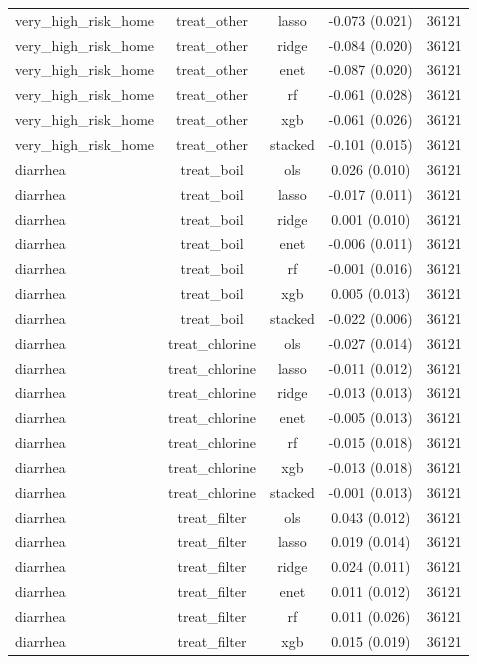 \begin{table}[htbp]
\begin{tabular}{lcccc}
very_high_risk_home & treat_other & lasso & -0.073 (0.021) & 36121 \\
very_high_risk_home & treat_other & ridge & -0.084 (0.020) & 36121 \\
very_high_risk_home & treat_other & enet & -0.087 (0.020) & 36121 \\
very_high_risk_home & treat_other & rf & -0.061 (0.028) & 36121 \\
very_high_risk_home & treat_other & xgb & -0.061 (0.026) & 36121 \\
very_high_risk_home & treat_other & stacked & -0.101 (0.015) & 36121 \\
diarrhea & treat_boil & ols & 0.026 (0.010) & 36121 \\
diarrhea & treat_boil & lasso & -0.017 (0.011) & 36121 \\
diarrhea & treat_boil & ridge & 0.001 (0.010) & 36121 \\
diarrhea & treat_boil & enet & -0.006 (0.011) & 36121 \\
diarrhea & treat_boil & rf & -0.001 (0.016) & 36121 \\
diarrhea & treat_boil & xgb & 0.005 (0.013) & 36121 \\
diarrhea & treat_boil & stacked & -0.022 (0.006) & 36121 \\
diarrhea & treat_chlorine & ols & -0.027 (0.014) & 36121 \\
diarrhea & treat_chlorine & lasso & -0.011 (0.012) & 36121 \\
diarrhea & treat_chlorine & ridge & -0.013 (0.013) & 36121 \\
diarrhea & treat_chlorine & enet & -0.005 (0.013) & 36121 \\
diarrhea & treat_chlorine & rf & -0.015 (0.018) & 36121 \\
diarrhea & treat_chlorine & xgb & -0.013 (0.018) & 36121 \\
diarrhea & treat_chlorine & stacked & -0.001 (0.013) & 36121 \\
diarrhea & treat_filter & ols & 0.043 (0.012) & 36121 \\
diarrhea & treat_filter & lasso & 0.019 (0.014) & 36121 \\
diarrhea & treat_filter & ridge & 0.024 (0.011) & 36121 \\
diarrhea & treat_filter & enet & 0.011 (0.012) & 36121 \\
diarrhea & treat_filter & rf & 0.011 (0.026) & 36121 \\
diarrhea & treat_filter & xgb & 0.015 (0.019) & 36121 \\

\end{tabular}
\end{table}
